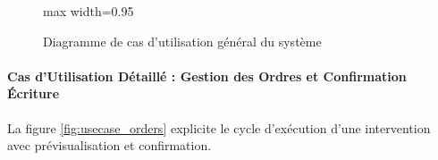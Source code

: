 \begin{figure}[!ht]
\begin{adjustbox}{max width=0.95\textwidth}
    \end{adjustbox}
    \caption{Diagramme de cas d'utilisation général du système}
    \label{fig:usecase_global}
\end{figure}

\paragraph{Cas d'Utilisation Détaillé : Gestion des Ordres et Confirmation Écriture}
La figure \ref{fig:usecase_orders} explicite le cycle d'exécution d'une intervention avec prévisualisation et confirmation.

